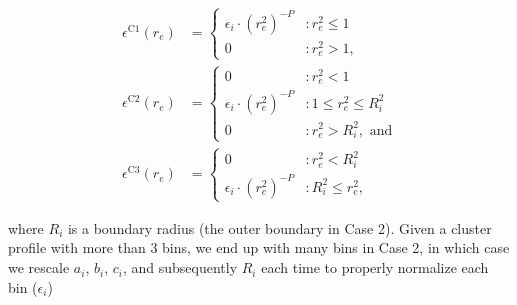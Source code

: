 \documentclass[twocolumn,traditabstract]{aa}
\begin{document}
\begin{align}
  \epsilon^{\text{C1}}(r_e) &= \begin{cases}
    \epsilon_i \cdot (r_e^2)^{-P} &: r_e^2 \leq 1 \\
                        0 &: r_e^2 > 1,
    \end{cases}
  \label{eqn:case1_shell} \\
  \epsilon^{\text{C2}}(r_e) &= \begin{cases}
                         0 &: r_e^2 < 1 \\
    \epsilon_i \cdot (r_e^2)^{-P} &: 1 \leq r_e^2 \leq R_i^2 \\
                         0 &: r_e^2 > R_i^2, \text{ and}
    \end{cases}
  \label{eqn:case2_shell} \\
  \epsilon^{\text{C3}}(r_e) &= \begin{cases}
                        0 &: r_e^2 < R_i^2 \\
    \epsilon_i \cdot (r_e^2)^{-P} &: R_i^2 \leq r_e^2, 
    \end{cases}
  \label{eqn:case3_shell} 
\end{align}

where $R_i$ is a boundary radius (the outer boundary in Case 2). Given a cluster profile with more than 3 bins, we end
up with many bins in Case 2, in which case we rescale $a_i$, $b_i$, $c_i$, and subsequently $R_i$ each time to properly
normalize each bin ($\epsilon_i$)
\end{document}

